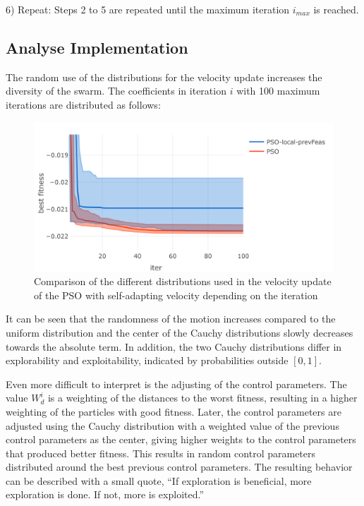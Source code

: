 \documentclass[
  oneside, a4paper, 12pt, openany]{book}
\theoremstyle{definition}
\theoremstyle{definition}
\theoremstyle{definition}
\theoremstyle{definition}
\theoremstyle{remark}
\begin{document}
6) Repeat: Steps 2 to 5 are repeated until the maximum iteration \(i_{max}\) is reached.

\hypertarget{analyse-implementation}{%
\subsection{Analyse Implementation}\label{analyse-implementation}}

The random use of the distributions for the velocity update increases the diversity of the swarm. The coefficients in iteration \(i\) with 100 maximum iterations are distributed as follows:

\begin{figure}[H]
\includegraphics{Master_Thesis_files/figure-latex/unnamed-chunk-14-1} \caption{Comparison of the different distributions used in the velocity update of the PSO with self-adapting velocity depending on the iteration}\label{fig:unnamed-chunk-14}
\end{figure}

It can be seen that the randomness of the motion increases compared to the uniform distribution and the center of the Cauchy distributions slowly decreases towards the absolute term. In addition, the two Cauchy distributions differ in explorability and exploitability, indicated by probabilities outside \([0, 1]\).

Even more difficult to interpret is the adjusting of the control parameters. The value \(W_d^i\) is a weighting of the distances to the worst fitness, resulting in a higher weighting of the particles with good fitness. Later, the control parameters are adjusted using the Cauchy distribution with a weighted value of the previous control parameters as the center, giving higher weights to the control parameters that produced better fitness. This results in random control parameters distributed around the best previous control parameters. The resulting behavior can be described with a small quote, ``If exploration is beneficial, more exploration is done. If not, more is exploited.''
\end{document}
